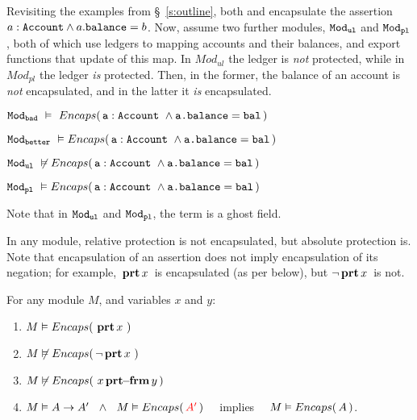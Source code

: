 Revisiting the examples from \S~\ref{s:outline}, %
both \ModB and \ModC encapsulate   the   assertion %
$a:{\texttt{Account}}\wedge a.{\texttt{balance}}=b$. %
{Now, assume two further modules, ${\texttt{Mod}}_{{\texttt{ul}}}$ and ${\texttt{Mod}}_{{\texttt{pl}}}$, both of which  use ledgers to mapping accounts and their balances, and export functions that update of this map. In $Mod_{ul}$ the ledger is \emph{not} protected, while in $Mod_{pl}$ the ledger \emph{is} protected. Then, in the former, the balance of an account is \emph{not} encapsulated, and in the latter it  \emph{is} encapsulated. } 
%
\\
\strut \hspace{1cm}
${\texttt{Mod}}_{{\texttt{bad}}}\ \vDash\ {Encaps(\,  {\texttt{a}}:{\texttt{Account}}\ \wedge {\texttt{a.balance}}={\texttt{bal}}\, )}$
\\
\strut \hspace{1cm}
${\texttt{Mod}}_{{\texttt{better}}}\ \vDash {\ensuremath Encaps(\,  {\texttt{a}}:{\texttt{Account}}\ \wedge {\texttt{a.balance}}={\texttt{bal}}\, )}$
\\
\strut \hspace{1cm} {${\texttt{Mod}}_{{\texttt{ul}}}\ \not\vDash {\ensuremath Encaps(\,  {\texttt{a}}:{\texttt{Account}}\ \wedge {\texttt{a.balance}}={\texttt{bal}}\, )}$}
\\
\strut \hspace{1cm} {${\texttt{Mod}}_{{\texttt{pl}}}\  \vDash {\ensuremath Encaps(\,  {\texttt{a}}:{\texttt{Account}}\ \wedge {\texttt{a.balance}}={\texttt{bal}}\, )}$}

\noindent
{Note that in ${\texttt{Mod}}_{{\texttt{ul}}}$ and ${\texttt{Mod}}_{{\texttt{pl}}}$, the term  is a ghost field.}



In any module, relative protection %
is not encapsulated, but  absolute protection is.
 Note  that  encapsulation of an assertion does not imply encapsulation of its negation; 
 for example,  ${{\, \mathbf{prt}\, x\, }}$ is encapsulated (as per below), but $\neg  {{\ensuremath{\, \mathbf{prt}}\, x\, }}$ is not.


\begin{lemma}
For any module $M$, and variables $x$ and $y$:
\begin{enumerate} 
\item $M \vDash {\ensuremath Encaps(\, {\ensuremath{\, \mathbf{prt}}\, x\, }\, )}$
\item $M \not\vDash {{\ensuremath Encaps(\, \neg{\ensuremath{\, \mathbf{prt}}\, x\, }\, )}}$
\item $M \not\vDash {{\ensuremath Encaps(\, {\ensuremath{\, x\, \mathbf{prt\!\!-\!\!frm}}\, y}\, )}}$
\item $M \vDash A \rightarrow A' \ \ \wedge\ \  M \vDash  \encaps{\red{A'}}$ \ \ implies \ \ $M \vDash  {\ensuremath Encaps(\, A\, )}$.
\end{enumerate}
\end{lemma}

